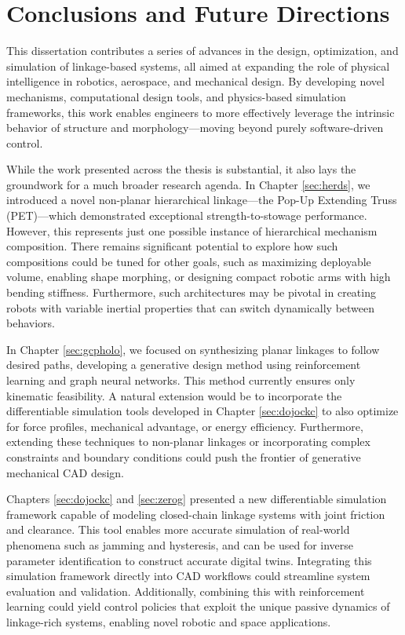 \chapter{Conclusions and Future Directions}
\label{sec:conclusions}

This dissertation contributes a series of advances in the design, optimization, and simulation of linkage-based systems, all aimed at expanding the role of physical intelligence in robotics, aerospace, and mechanical design. By developing novel mechanisms, computational design tools, and physics-based simulation frameworks, this work enables engineers to more effectively leverage the intrinsic behavior of structure and morphology—moving beyond purely software-driven control.

While the work presented across the thesis is substantial, it also lays the groundwork for a much broader research agenda. In Chapter \ref{sec:herds}, we introduced a novel non-planar hierarchical linkage—the Pop-Up Extending Truss (PET)—which demonstrated exceptional strength-to-stowage performance. However, this represents just one possible instance of hierarchical mechanism composition. There remains significant potential to explore how such compositions could be tuned for other goals, such as maximizing deployable volume, enabling shape morphing, or designing compact robotic arms with high bending stiffness. Furthermore, such architectures may be pivotal in creating robots with variable inertial properties that can switch dynamically between behaviors.

In Chapter \ref{sec:gcpholo}, we focused on synthesizing planar linkages to follow desired paths, developing a generative design method using reinforcement learning and graph neural networks. This method currently ensures only kinematic feasibility. A natural extension would be to incorporate the differentiable simulation tools developed in Chapter \ref{sec:dojockc} to also optimize for force profiles, mechanical advantage, or energy efficiency. Furthermore, extending these techniques to non-planar linkages or incorporating complex constraints and boundary conditions could push the frontier of generative mechanical CAD design.

Chapters \ref{sec:dojockc} and \ref{sec:zerog} presented a new differentiable simulation framework capable of modeling closed-chain linkage systems with joint friction and clearance. This tool enables more accurate simulation of real-world phenomena such as jamming and hysteresis, and can be used for inverse parameter identification to construct accurate digital twins. Integrating this simulation framework directly into CAD workflows could streamline system evaluation and validation. Additionally, combining this with reinforcement learning could yield control policies that exploit the unique passive dynamics of linkage-rich systems, enabling novel robotic and space applications.

